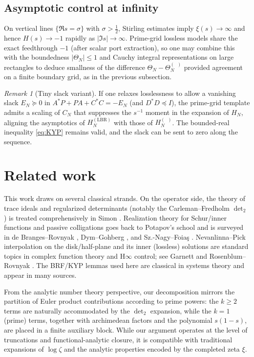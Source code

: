 \documentclass[11pt]{article}
\theoremstyle{remark}
\newtheorem{remark}[theorem]{Remark}
\DeclareMathOperator{\dettwo}{det_2}
\begin{document}
\subsection{Asymptotic control at infinity}
On vertical lines \(\{\Re s=\sigma\}\) with \(\sigma>\tfrac12\), Stirling estimates imply \(\xi(s)\to\infty\) and hence \(H(s)\to -1\) rapidly as \(|\Im s|\to\infty\). Prime-grid lossless models share the exact feedthrough \(-1\) (after scalar port extraction), so one may combine this with the boundedness \(|\Theta_N|\le 1\) and Cauchy integral representations on large rectangles to deduce smallness of the difference \(\Theta_N-\Theta_N^{(\dettwo)}\) provided agreement on a finite boundary grid, as in the previous subsection.

\begin{remark}[Tiny slack variant]
If one relaxes losslessness to allow a vanishing slack \(E_N\succeq 0\) in \(A^*P+PA+C^*C=-E_N\) (and \(D^*D\preceq I\)), the prime-grid template admits a scaling of \(C_N\) that suppresses the \(s^{-1}\) moment in the expansion of \(H_N\), aligning the asymptotics of \(H_N^{(\mathrm{LBR})}\) with those of \(H_N^{(\dettwo)}\). The bounded-real inequality \eqref{eq:KYP} remains valid, and the slack can be sent to zero along the sequence.
\end{remark}

\section{Related work}\label{sec:related}
This work draws on several classical strands. On the operator side, the theory of trace ideals and regularized determinants (notably the Carleman--Fredholm \(\det_2\)) is treated comprehensively in Simon \cite{SimonTraceIdeals}. Realization theory for Schur/inner functions and passive colligations goes back to Potapov's school and is surveyed in de Branges--Rovnyak \cite{deBrangesRovnyak}, Dym--Gohberg \cite{DymGohberg}, and Sz.-Nagy--Foia\c{s} \cite{SzNagyFoias}. Nevanlinna--Pick interpolation on the disk/half-plane and its inner (lossless) solutions are standard topics in complex function theory and H\(\infty\) control; see Garnett \cite{Garnett} and Rosenblum--Rovnyak \cite{RosenblumRovnyak}. The BRF/KYP lemmas used here are classical in systems theory and appear in many sources.

From the analytic number theory perspective, our decomposition mirrors the partition of Euler product contributions according to prime powers: the \(k\ge 2\) terms are naturally accommodated by the \(\det_2\) expansion, while the \(k=1\) (prime) terms, together with archimedean factors and the polynomial \(s(1-s)\), are placed in a finite auxiliary block. While our argument operates at the level of truncations and functional-analytic closure, it is compatible with traditional expansions of \(\log \zeta\) and the analytic properties encoded by the completed zeta \(\xi\).
\end{document}
